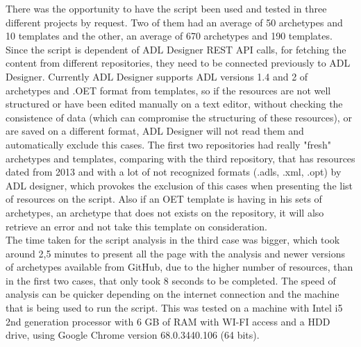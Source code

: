 \documentclass[mim_thesis.tex]{subfiles}
\begin{document}
There was the opportunity to have the script been used and tested in three different projects by request. Two of them had an average of 50 archetypes and 10 templates and the other, an average of 670 archetypes and 190 templates. Since the script is dependent of ADL Designer REST API calls, for fetching the content from different repositories, they need to be connected previously to ADL Designer. Currently ADL Designer supports ADL versions 1.4 and 2 of archetypes and .OET format from templates, so if the resources are not well structured or have been edited manually on a text editor, without checking the consistence of data (which can compromise the structuring of these resources), or are saved on a different format, ADL Designer will not read them and automatically exclude this cases. The first two repositories had really "fresh" archetypes and templates, comparing with the third repository, that has resources dated from 2013 and with a lot of not recognized formats (.adls, .xml, .opt) by ADL designer, which provokes the exclusion of this cases when presenting the list of resources on the script. Also if an OET template is having in his sets of archetypes, an archetype that does not exists on the repository, it will also retrieve an error and not take this template on consideration. \\

The time taken for the script analysis in the third case was bigger, which took around 2,5 minutes to present all the page with the analysis and newer versions of archetypes available from GitHub, due to the higher number of resources, than in the first two cases, that only took 8 seconds to be completed. The speed of analysis can be quicker depending on the internet connection and the machine that is being used to run the script. This was tested on a machine with Intel i5 2nd generation processor with 6 GB of RAM with WI-FI access and a HDD drive, using Google Chrome version 68.0.3440.106 (64 bits).
\end{document}
